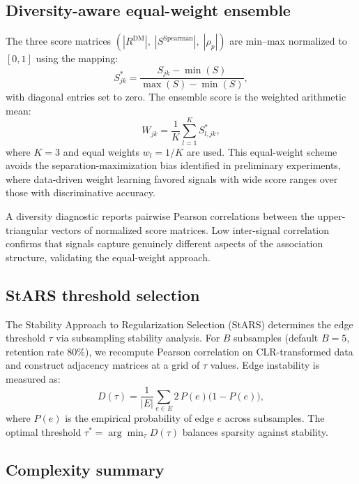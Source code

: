 \documentclass[fleqn]{nature}
\begin{document}
\begin{methods}
\subsection*{Diversity-aware equal-weight ensemble}

The three score matrices $(|R^{\text{DM}}|,\; |S^{\text{Spearman}}|,\; |\rho_p|)$ are min--max normalized to $[0,1]$ using the mapping:
\begin{equation}
S^*_{jk} = \frac{S_{jk} - \min(S)}{\max(S) - \min(S)},
\end{equation}
with diagonal entries set to zero.
The ensemble score is the weighted arithmetic mean:
\begin{equation}
W_{jk} = \frac{1}{K}\sum_{l=1}^{K} S^*_{l,jk},
\end{equation}
where $K = 3$ and equal weights $w_l = 1/K$ are used.
This equal-weight scheme avoids the separation-maximization bias identified in preliminary experiments, where data-driven weight learning favored signals with wide score ranges over those with discriminative accuracy.

A diversity diagnostic reports pairwise Pearson correlations between the upper-triangular vectors of normalized score matrices.
Low inter-signal correlation confirms that signals capture genuinely different aspects of the association structure, validating the equal-weight approach.


\subsection*{StARS threshold selection}

The Stability Approach to Regularization Selection (StARS)\cite{liu2010} determines the edge threshold $\tau$ via subsampling stability analysis.
For $B$ subsamples (default $B = 5$, retention rate 80\%), we recompute Pearson correlation on CLR-transformed data and construct adjacency matrices at a grid of $\tau$ values.
Edge instability is measured as:
\begin{equation}
D(\tau) = \frac{1}{|E|}\sum_{e \in E} 2\,P(e)\bigl(1 - P(e)\bigr),
\end{equation}
where $P(e)$ is the empirical probability of edge $e$ across subsamples.
The optimal threshold $\tau^* = \arg\min_\tau D(\tau)$ balances sparsity against stability.


\subsection*{Complexity summary}


\end{methods}
\end{document}
